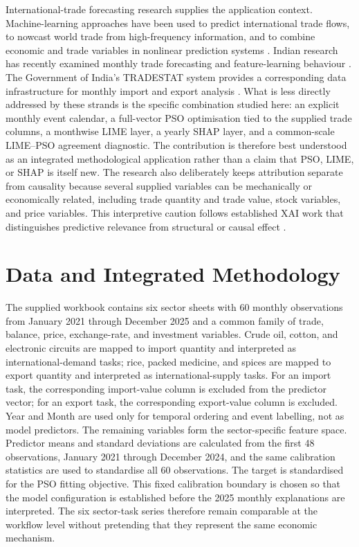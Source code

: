 \documentclass[pdftex,sn-mathphys-num]{sn-jnl}
\begin{document}
International-trade forecasting research supplies the application context. Machine-learning approaches have been used to predict international trade flows, to nowcast world trade from high-frequency information, and to combine economic and trade variables in nonlinear prediction systems \cite{josic2022,chinn2023,yang2023}. Indian research has recently examined monthly trade forecasting and feature-learning behaviour \cite{balasubramanian2026}. The Government of India's TRADESTAT system provides a corresponding data infrastructure for monthly import and export analysis \cite{tradestat}. What is less directly addressed by these strands is the specific combination studied here: an explicit monthly event calendar, a full-vector PSO optimisation tied to the supplied trade columns, a monthwise LIME layer, a yearly SHAP layer, and a common-scale LIME--PSO agreement diagnostic. The contribution is therefore best understood as an integrated methodological application rather than a claim that PSO, LIME, or SHAP is itself new. The research also deliberately keeps attribution separate from causality because several supplied variables can be mechanically or economically related, including trade quantity and trade value, stock variables, and price variables. This interpretive caution follows established XAI work that distinguishes predictive relevance from structural or causal effect \cite{janzing2020,longo2024,rudin2019}.

\section{Data and Integrated Methodology}
The supplied workbook contains six sector sheets with 60 monthly observations from January 2021 through December 2025 and a common family of trade, balance, price, exchange-rate, and investment variables. Crude oil, cotton, and electronic circuits are mapped to import quantity and interpreted as international-demand tasks; rice, packed medicine, and spices are mapped to export quantity and interpreted as international-supply tasks. For an import task, the corresponding import-value column is excluded from the predictor vector; for an export task, the corresponding export-value column is excluded. Year and Month are used only for temporal ordering and event labelling, not as model predictors. The remaining variables form the sector-specific feature space. Predictor means and standard deviations are calculated from the first 48 observations, January 2021 through December 2024, and the same calibration statistics are used to standardise all 60 observations. The target is standardised for the PSO fitting objective. This fixed calibration boundary is chosen so that the model configuration is established before the 2025 monthly explanations are interpreted. The six sector-task series therefore remain comparable at the workflow level without pretending that they represent the same economic mechanism.
\end{document}
